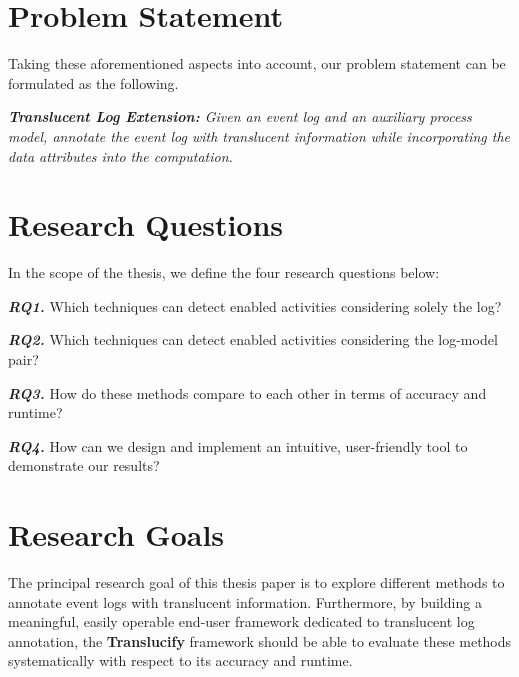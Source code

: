 \section{Problem Statement}
\label{sec:intro_ssec:probs}

Taking these aforementioned aspects into account, our problem statement can be formulated as the following.

\begin{tcolorbox}[colback=gray!10!white, colframe=black, boxrule=0.5mm, arc=0mm, left=5mm, right=5mm, top=3mm, bottom=3mm]
	\emph{\textbf{Translucent Log Extension:} Given an event log and an auxiliary process model, annotate the event log with translucent information while incorporating the data attributes into the computation.}
\end{tcolorbox}

\section{Research Questions}

In the scope of the thesis, we define the four research questions below: 

\textbf{\emph{RQ1.}} Which techniques can detect enabled activities considering solely the log?

\textbf{\emph{RQ2.}} Which techniques can detect enabled activities considering the log-model pair?

\textbf{\emph{RQ3.}} How do these methods compare to each other in terms of accuracy and runtime?

\textbf{\emph{RQ4.}} How can we design and implement an intuitive, user-friendly tool to demonstrate our results?


\section{Research Goals}

The principal research goal of this thesis paper is to explore different methods to annotate event logs with translucent information. Furthermore, by building a meaningful, easily operable end-user framework dedicated to translucent log annotation, the \textbf{Translucify} framework should be able to evaluate these methods systematically with respect to its accuracy and runtime.


